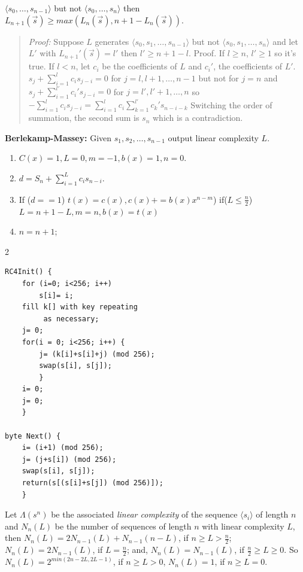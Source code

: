 $\langle s_0, \ldots , s_{n-1} \rangle$ but not
$\langle s_0, \ldots , s_{n} \rangle$ then 
$L_{n+1}({\vec s}) \ge max(L_n({\vec s}), n+1-L_n({\vec s}))$.  
\begin{quote}
\emph{Proof:}
Suppose $L$ generates $\langle s_0 , s_1 , \ldots , s_{n-1} \rangle$ but not
$\langle s_0 , s_1 , \ldots , s_{n} \rangle$ and let $L'$ with
$L_{n+1}'({\vec s})= l'$ then $l' \ge n+1-l$.  Proof.  If $l \ge n$,
$l' \ge 1$ so it's true.  If $l<n$, let $c_i$ be the coefficients of $L$ and
$c_i'$, the coefficients of $L'$.  
$s_j + \sum_{i=1}^l c_i s_{j-i}=0$ for $j= l, l+1, \ldots , n-1$ but not for $j=n$ and
$s_j + \sum_{i=1}^{l'} c_i' s_{j-i}=0$ for $j= l', l'+1, \ldots , n$  so
$-\sum_{i=1}^l c_i s_{j-i}= \sum_{i=1}^l c_i \sum_{k=1}^{l'} c_k' s_{n-i-k}$
Switching the
order of summation, the second sum is $s_n$  which is a contradiction.
\end{quote}
{\bf Berlekamp-Massey:} Given $s_1 , s_2 , \ldots , s_{n-1}$
output linear complexity $L$.
\begin{enumerate}
\item $C(x)= 1, L= 0, m=-1, b(x)= 1, n= 0$.
\item $d= S_n + \sum_{i=1}^L c_i s_{n-i}$.
\item If ($d==1$) $t(x)= c(x), c(x)+= b(x)x^{n-m}$)
if($L \leq {\frac n 2}$)
$L= n+1-L, m=n, b(x)= t(x)$
\item $n= n+1$;
\end{enumerate}
\begin {multicols} {2} {
\begin {verbatim}
RC4Init() {
    for (i=0; i<256; i++)
        s[i]= i;
    fill k[] with key repeating 
         as necessary;
    j= 0;
    for(i = 0; i<256; i++) {
        j= (k[i]+s[i]+j) (mod 256); 
        swap(s[i], s[j]);
        }
    i= 0;
    j= 0;
    }

byte Next() {
    i= (i+1) (mod 256);
    j= (j+s[i]) (mod 256);
    swap(s[i], s[j]);
    return(s[(s[i]+s[j]) (mod 256)]);
    }
\end{verbatim}
}
\end {multicols}
Let $\Lambda(s^n)$ be the associated \emph{linear complexity}
of the sequence $\langle s_i \rangle$ of
length $n$ and $N_n(L)$ be the number of sequences of length $n$ with linear complexity $L$,
then $N_n(L) = 2 N_{n-1}(L) + N_{n-1}(n-L)$, if $n \ge L > {\frac n 2}$;
$N_n(L) = 2 N_{n-1}(L)$, if $L = {\frac n 2}$; and,
$N_n(L) = N_{n-1}(L)$, if ${\frac n 2} \ge L \ge 0$. So
$N_n(L)= 2^{min(2n-2L, 2L-1)}$, if $n \ge L >0$,
$N_n(L)= 1$, if $n \ge L = 0$.  
